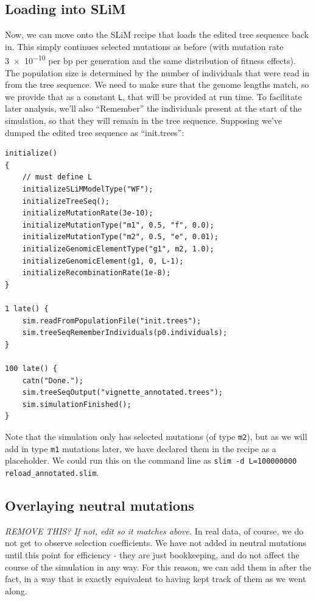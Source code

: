 \documentclass[12pt]{article}
\newcommand{\comment}[1]{\textit{\color{green} #1}}
\begin{document}
\subsection*{Loading into SLiM}

Now, we can move onto the SLiM recipe
that loads the edited tree sequence back in.
This simply continues selected mutations as before
(with mutation rate \num{3e-10} per bp per generation and the same distribution of fitness effects).
The population size is determined by the number of individuals
that were read in from the tree sequence.
We need to make sure that the genome lengths match,
so we provide that as a constant \verb|L|, that will be provided at run time.
To facilitate later analysis,
we’ll also ``Remember'' the individuals present at the start of the simulation,
so that they will remain in the tree sequence.
Supposing we've dumped the edited tree sequence as ``init.trees'':
\begin{lstlisting}[language=slim]
initialize()
{
    // must define L
    initializeSLiMModelType("WF");
    initializeTreeSeq();
    initializeMutationRate(3e-10);
    initializeMutationType("m1", 0.5, "f", 0.0);
    initializeMutationType("m2", 0.5, "e", 0.01);
    initializeGenomicElementType("g1", m2, 1.0);
    initializeGenomicElement(g1, 0, L-1);
    initializeRecombinationRate(1e-8);
}

1 late() { 
    sim.readFromPopulationFile("init.trees");
    sim.treeSeqRememberIndividuals(p0.individuals);
}

100 late() {
    catn("Done.");
    sim.treeSeqOutput("vignette_annotated.trees");
    sim.simulationFinished();
}
\end{lstlisting}

Note that the simulation only has selected mutations (of type \verb|m2|),
but as we will add in type \verb|m1| mutations later,
we have declared them in the recipe as a placeholder.
We could run this on the command line as \verb|slim -d L=100000000 reload_annotated.slim|.


\subsection*{Overlaying neutral mutations}

\comment{REMOVE THIS? If not, edit so it matches above.}
In real data, of course, we do not get to observe selection coefficients.
We have not added in neutral mutations until this point for efficiency - they are just bookkeeping,
and do not affect the course of the simulation in any way.
For this reason, we can add them in after the fact,
in a way that is exactly equivalent to having kept track of them as we went along.
\end{document}

